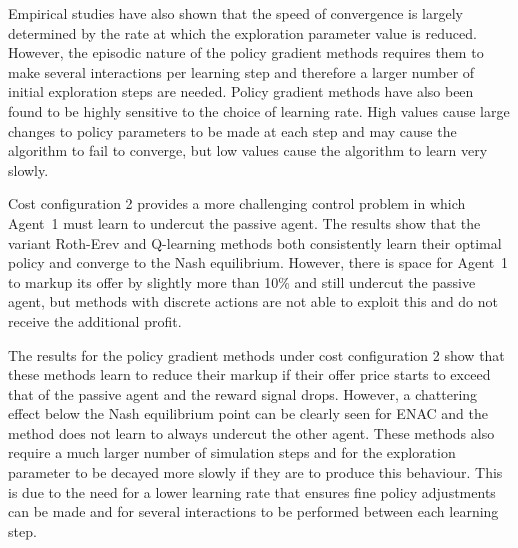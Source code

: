 Empirical studies have also shown that the speed of convergence is largely
determined by the rate at which the exploration parameter value is reduced.
However, the episodic nature of the policy gradient methods requires them to
make several interactions per learning step and therefore a larger number of
initial exploration steps are needed.  Policy gradient methods have also been
found to be highly sensitive to the choice of learning rate.  High
values cause large changes to policy parameters to be made at each step and
may cause the algorithm to fail to converge, but low values cause the
algorithm to learn very slowly.

Cost configuration 2 provides a more challenging control problem in which
Agent~1 must learn to undercut the passive agent.  The results show that the
variant Roth-Erev and Q-learning methods both consistently learn their optimal
policy and converge to the Nash equilibrium.  However, there is space for
Agent~1 to markup its offer by slightly more than 10\% and still undercut the
passive agent, but methods with discrete actions are not able to exploit this
and do not receive the additional profit.

The results for the policy gradient methods under cost configuration 2 show that
these methods learn to reduce their markup if their offer price starts to exceed
that of the passive agent and the reward signal drops.  However, a chattering
effect below the Nash equilibrium point can be clearly seen for ENAC and the
method does not learn to always undercut the other agent.  These methods also
require a much larger number of simulation steps and for the exploration
parameter to be decayed more slowly if they are to produce this behaviour.  This
is due to the need for a lower learning rate that ensures fine policy
adjustments can be made and for several interactions to be performed between
each learning step.

